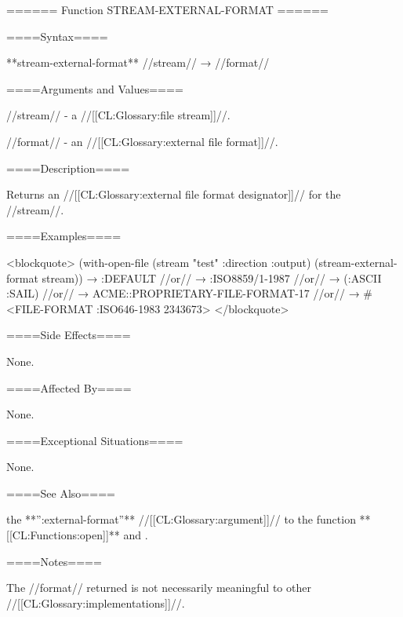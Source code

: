 ====== Function STREAM-EXTERNAL-FORMAT ======

====Syntax====

**stream-external-format** //stream// → //format//

====Arguments and Values====

//stream// - a //[[CL:Glossary:file stream]]//.

//format// - an //[[CL:Glossary:external file format]]//.

====Description====

Returns an //[[CL:Glossary:external file format designator]]// for the //stream//.

====Examples====

<blockquote> (with-open-file (stream "test" :direction :output) (stream-external-format stream)) → :DEFAULT //or// → :ISO8859/1-1987 //or// → (:ASCII :SAIL) //or// → ACME::PROPRIETARY-FILE-FORMAT-17 //or// → #<FILE-FORMAT :ISO646-1983 2343673> </blockquote>

====Side Effects====

None.

====Affected By====

None.

====Exceptional Situations====

None.

====See Also====

the **'':external-format''** //[[CL:Glossary:argument]]// to the function **[[CL:Functions:open]]** and .

====Notes====

The //format// returned is not necessarily meaningful to other //[[CL:Glossary:implementations]]//.

